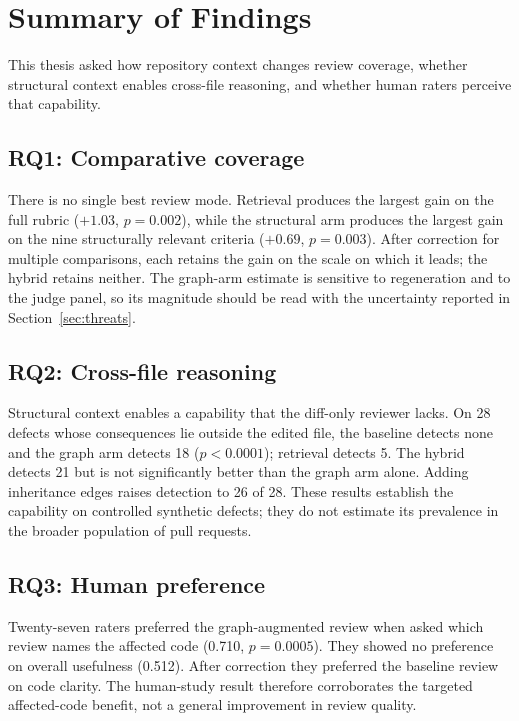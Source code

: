 \section{Summary of Findings}
\label{sec:conclusion-summary}

This thesis asked how repository context changes review coverage, whether
structural context enables cross-file reasoning, and whether human raters
perceive that capability.

\subsection*{RQ1: Comparative coverage}

There is no single best review mode. Retrieval produces the largest gain on
the full rubric ($+1.03$, $p = 0.002$), while the structural
arm produces the largest gain on the nine structurally relevant criteria
($+0.69$, $p = 0.003$).
After correction for multiple comparisons, each retains the gain on the scale
on which it leads; the hybrid retains neither. The graph-arm estimate is
sensitive to regeneration and to the judge panel, so its magnitude should be
read with the uncertainty reported in Section~\ref{sec:threats}.

\subsection*{RQ2: Cross-file reasoning}

Structural context enables a capability that the diff-only reviewer lacks. On
28 defects whose consequences lie outside the edited file, the baseline
detects none and the graph arm detects 18 ($p < 0.0001$); retrieval
detects 5. The hybrid detects 21 but is not significantly better than the graph
arm alone. Adding inheritance edges raises detection to 26 of 28. These
results establish the capability on controlled
synthetic defects; they do not estimate its prevalence in the broader
population of pull requests.

\subsection*{RQ3: Human preference}

Twenty-seven raters preferred the graph-augmented review when asked which review names the affected code
(0.710, $p = 0.0005$). They showed no preference on
overall usefulness (0.512). After correction they preferred the baseline
review on code clarity. The human-study result therefore corroborates the
targeted affected-code benefit, not a general improvement in review quality.

